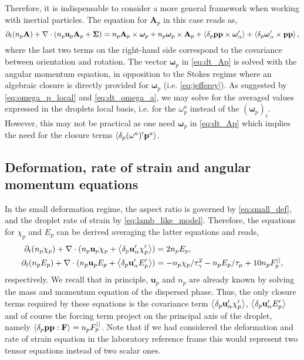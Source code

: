 Therefore, it is indispensable to consider a more general framework when working with inertial particles. 
The equation for $\textbf{A}_p$ in this case reads as, 
\begin{equation}
    \pddt (n_p\textbf{A})
    + \div (
        n_p\textbf{u}_p\textbf{A}_p
        + \mathbf{\Sigma}
        )
    =
    n_p \textbf{A}_p \times \bm\omega_p
    + n_p \bm\omega_p \times \textbf{A}_p
    + \pavg{\textbf{pp} \times \bm\omega_\alpha'}
    + \pavg{\bm\omega_\alpha' \times \textbf{pp}},
    \label{eq:dt_Ap}
\end{equation}
where the last two terms on the right-hand side correspond to the covariance between orientation and rotation. 
The vector $\bm\omega_p$ in \ref{eq:dt_Ap} is solved with the angular momentum equation, in opposition to the Stokes regime where an algebraic closure is directly provided for $\bm\omega_p$ (i.e. \ref{eq:jefferey}). 
As suggested by \ref{eq:omega_p_local} and \ref{eq:dt_omega_a}, we may solve for the averaged values expressed in the droplets local basis, i.e. for the $\omega^a_p$ instead of the $(\bm\omega_p)_i$.
However, this may not be practical as one need $\bm\omega_p$ in \ref{eq:dt_Ap} which implies the need for the closure terms $\left<\delta_p (\omega^a)' \textbf{p}^a\right>$.


\subsection{Deformation, rate of strain and angular momentum equations}

In the small deformation regime, the aspect ratio is governed by \ref{eq:small_def}, and the droplet rate of strain by  \ref{eq:lamb_like_model}. 
Therefore, the equations for $\chi_p$ and $E_p$ can be derived averaging the latter equations and reads,  
\begin{align}
    \pddt (n_p \chi_p)
    + \div (
        n_p \textbf{u}_p \chi_p 
        + \pavg{\textbf{u}_\alpha' \chi_p'}
    )
    &= 2 n_p E_p,
    \label{eq:avg_chi_I}
    \\
    \pddt (n_p E_p)
    + \div (
        n_p \textbf{u}_p E_p 
        + \pavg{\textbf{u}_\alpha' E_p'}
    )
    &= 
    -  n_p \chi_p / \tau_\gamma^2
    - n_p E_p / \tau_\mu
    + 10 n_p F^{||}_p,
    \label{eq:avg_E_I}
\end{align}
respectively.
We recall that in principle, $\textbf{u}_p$ and $n_p$ are already known by solving the mass and momentum equation of the dispersed phase.
Thus, the only closure terms required by these equations is the covariance term $\left<\delta_p \textbf{u}_\alpha' \chi_p'\right>$, $ \left<\delta_p \textbf{u}_\alpha' E_p'\right>$ and of course the forcing term project on the principal axis of the droplet, namely $\left<\delta_p \textbf{pp} : \textbf{F}\right> = n_p F_p^{||}$. 
Note that if we had considered the deformation and rate of strain equation in the laboratory reference frame this would represent two tensor equations instead of two scalar ones. 


